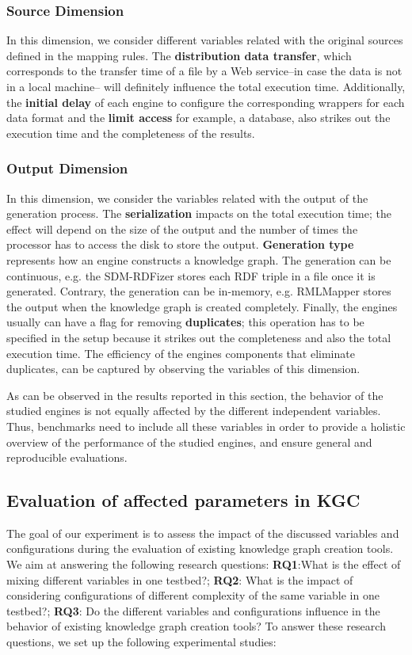 \subsubsection{Source Dimension}
In this dimension, we consider different variables related with the original sources defined in the mapping rules. The \textbf{distribution data transfer}, which corresponds to the transfer time of a file by a Web service--in case the data is not in a local machine-- will definitely influence the total execution time. Additionally, the \textbf{initial delay} of each engine to configure the corresponding wrappers for each data format and the \textbf{limit access} for example, a database, also strikes out the execution time and the completeness of the results.

\subsubsection{Output Dimension}
In this dimension, we consider the variables related with the output of the generation process. The \textbf{serialization} impacts on the total execution time; the effect will depend on the size of the output and the number of times the processor has to access the disk to store the output. \textbf{Generation type} represents how an engine constructs a knowledge graph. The generation can be continuous, e.g. the SDM-RDFizer stores each RDF triple in a file once it is generated. Contrary, the generation can be in-memory, e.g. RMLMapper stores the output when the knowledge graph is created completely. Finally, the engines usually can have a flag for removing \textbf{duplicates}; this operation has to be specified in the setup because it strikes out the completeness and also the total execution time. The efficiency of the engines components that eliminate duplicates, can be captured by observing the variables of this dimension.   

As can be observed in the results reported in this section, the behavior of the studied engines is not equally affected by the different independent variables. Thus, benchmarks need to include all these variables in order to provide a holistic overview of the performance of the studied engines, and ensure general and reproducible evaluations. 


\subsection{Evaluation of affected parameters in KGC}
The goal of our experiment is to assess the impact of the discussed variables and configurations during the evaluation of existing knowledge graph creation tools. We aim at answering the following research questions: \textbf{RQ1}:What is the effect of mixing different variables in one testbed?; \textbf{RQ2}: What is the impact of considering configurations of different complexity of the same variable in one testbed?; \textbf{RQ3}: Do the different variables and configurations influence in the behavior of existing knowledge graph creation tools? To answer these research questions, we set up the following experimental studies:

